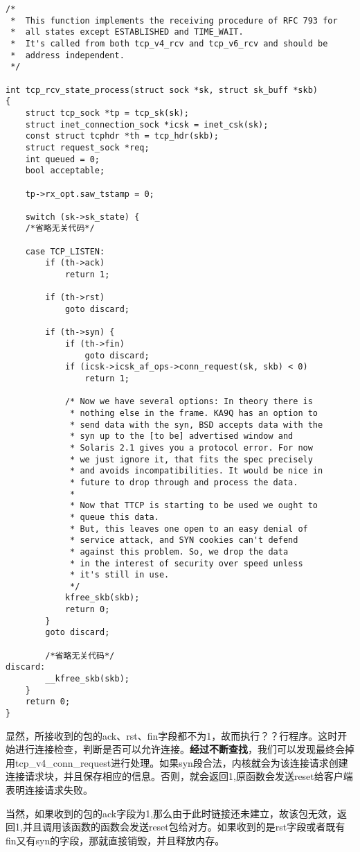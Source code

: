 \documentclass[11pt, a4paper,oneside]{book}
\theoremstyle{ocrenumbox}
\theoremstyle{purplenumbox}
\theoremstyle{blackbox}
\begin{document}
\begin{verbatim}
/*
 *	This function implements the receiving procedure of RFC 793 for
 *	all states except ESTABLISHED and TIME_WAIT.
 *	It's called from both tcp_v4_rcv and tcp_v6_rcv and should be
 *	address independent.
 */

int tcp_rcv_state_process(struct sock *sk, struct sk_buff *skb)
{
	struct tcp_sock *tp = tcp_sk(sk);
	struct inet_connection_sock *icsk = inet_csk(sk);
	const struct tcphdr *th = tcp_hdr(skb);
	struct request_sock *req;
	int queued = 0;
	bool acceptable;

	tp->rx_opt.saw_tstamp = 0;

	switch (sk->sk_state) {
	/*省略无关代码*/

	case TCP_LISTEN:
		if (th->ack)
			return 1;

		if (th->rst)
			goto discard;

		if (th->syn) {
			if (th->fin)
				goto discard;
			if (icsk->icsk_af_ops->conn_request(sk, skb) < 0)
				return 1;

			/* Now we have several options: In theory there is
			 * nothing else in the frame. KA9Q has an option to
			 * send data with the syn, BSD accepts data with the
			 * syn up to the [to be] advertised window and
			 * Solaris 2.1 gives you a protocol error. For now
			 * we just ignore it, that fits the spec precisely
			 * and avoids incompatibilities. It would be nice in
			 * future to drop through and process the data.
			 *
			 * Now that TTCP is starting to be used we ought to
			 * queue this data.
			 * But, this leaves one open to an easy denial of
			 * service attack, and SYN cookies can't defend
			 * against this problem. So, we drop the data
			 * in the interest of security over speed unless
			 * it's still in use.
			 */
			kfree_skb(skb);
			return 0;
		}
		goto discard;

		/*省略无关代码*/
discard:
		__kfree_skb(skb);
	}
	return 0;
}
\end{verbatim}

                显然，所接收到的包的ack、rst、fin字段都不为1，故而执行？？行程序。这时开始进行连接检查，判断是否可以允许连接。\textbf{经过不断查找}，我们可以发现最终会掉用tcp\_v4\_conn\_request进行处理。如果syn段合法，内核就会为该连接请求创建连接请求块，并且保存相应的信息。否则，就会返回1,原函数会发送reset给客户端表明连接请求失败。

				当然，如果收到的包的ack字段为1,那么由于此时链接还未建立，故该包无效，返回1,并且调用该函数的函数会发送reset包给对方。如果收到的是rst字段或者既有fin又有syn的字段，那就直接销毁，并且释放内存。
\end{document}

